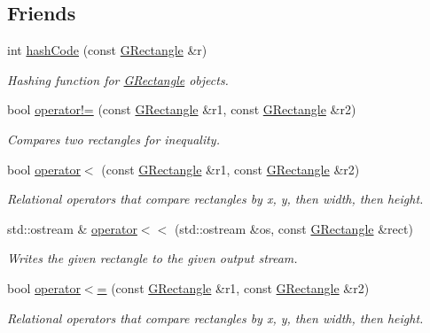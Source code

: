 \subsection*{Friends}
\begin{DoxyCompactItemize}
\item 
int \mbox{\hyperlink{classGRectangle_ab57157a3dc26b4cf53d7b84e281bf7d5}{hash\+Code}} (const \mbox{\hyperlink{classGRectangle}{G\+Rectangle}} \&r)
\begin{DoxyCompactList}\small\item\em Hashing function for \mbox{\hyperlink{classGRectangle}{G\+Rectangle}} objects. \end{DoxyCompactList}\item 
bool \mbox{\hyperlink{classGRectangle_ab1f9c96d97d7895bcd908ba94af3bed7}{operator!=}} (const \mbox{\hyperlink{classGRectangle}{G\+Rectangle}} \&r1, const \mbox{\hyperlink{classGRectangle}{G\+Rectangle}} \&r2)
\begin{DoxyCompactList}\small\item\em Compares two rectangles for inequality. \end{DoxyCompactList}\item 
bool \mbox{\hyperlink{classGRectangle_a4a0fc8587bc8eccebfdd62416942c5d8}{operator$<$}} (const \mbox{\hyperlink{classGRectangle}{G\+Rectangle}} \&r1, const \mbox{\hyperlink{classGRectangle}{G\+Rectangle}} \&r2)
\begin{DoxyCompactList}\small\item\em Relational operators that compare rectangles by x, y, then width, then height. \end{DoxyCompactList}\item 
std\+::ostream \& \mbox{\hyperlink{classGRectangle_a9986499c29c915ee31d512f44a8f8a0d}{operator$<$$<$}} (std\+::ostream \&os, const \mbox{\hyperlink{classGRectangle}{G\+Rectangle}} \&rect)
\begin{DoxyCompactList}\small\item\em Writes the given rectangle to the given output stream. \end{DoxyCompactList}\item 
bool \mbox{\hyperlink{classGRectangle_a3588a1e1157026c5ef8c0ed41ba78890}{operator$<$=}} (const \mbox{\hyperlink{classGRectangle}{G\+Rectangle}} \&r1, const \mbox{\hyperlink{classGRectangle}{G\+Rectangle}} \&r2)
\begin{DoxyCompactList}\small\item\em Relational operators that compare rectangles by x, y, then width, then height. \end{DoxyCompactList}\item 

\end{DoxyCompactItemize}

